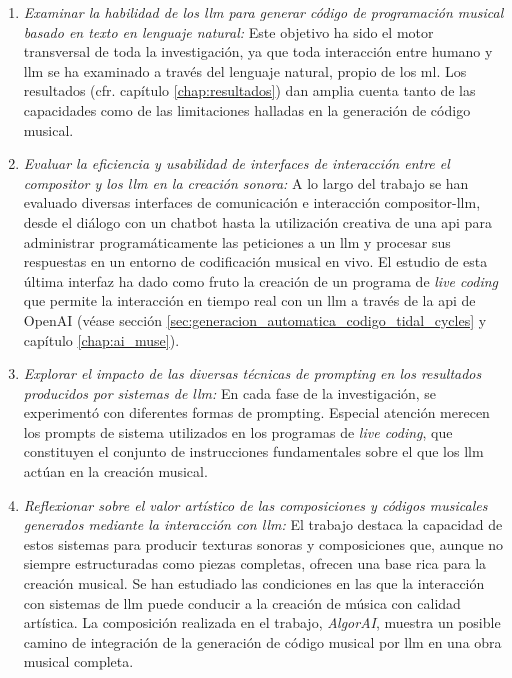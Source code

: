 \begin{enumerate}[label=\alph*)]
    \item \textit{Examinar la habilidad de los \gls{llm} para generar código de programación musical basado en texto en lenguaje natural:} Este objetivo ha sido el motor transversal de toda la investigación, ya que toda interacción entre humano y \gls{llm} se ha examinado a través del lenguaje natural, propio de los \gls{ml}. Los resultados (cfr. capítulo \ref{chap:resultados}) dan amplia cuenta tanto de las capacidades como de las limitaciones halladas en la generación de código musical.
    

    \item \textit{Evaluar la eficiencia y usabilidad de interfaces de interacción entre el compositor y los \gls{llm} en la creación sonora:} A lo largo del trabajo se han evaluado diversas interfaces de comunicación e interacción compositor-\gls{llm}, desde el diálogo con un chatbot hasta la utilización creativa de una \gls{api} para administrar programáticamente las peticiones a un \gls{llm} y procesar sus respuestas en un entorno de codificación musical en vivo. El estudio de esta última interfaz ha dado como fruto la creación de un programa de \emph{live coding} que permite la interacción en tiempo real con un \gls{llm} a través de la \gls{api} de OpenAI (véase sección \ref{sec:generacion_automatica_codigo_tidal_cycles} y capítulo \ref{chap:ai_muse}).
    

    \item \textit{Explorar el impacto de las diversas técnicas de \emph{prompting} en los resultados producidos por sistemas de \gls{llm}:} En cada fase de la investigación, se experimentó con diferentes formas de prompting. Especial atención merecen los prompts de sistema utilizados en los programas de \emph{live coding}, que constituyen el conjunto de instrucciones fundamentales sobre el que los \gls{llm} actúan en la creación musical.
    
    
    \item \textit{Reflexionar sobre el valor artístico de las composiciones y códigos musicales generados mediante la interacción con \gls{llm}:}  El trabajo destaca la capacidad de estos sistemas para producir texturas sonoras y composiciones que, aunque no siempre estructuradas como piezas completas, ofrecen una base rica para la creación musical. Se han estudiado las condiciones en las que la interacción con sistemas de \gls{llm} puede conducir a la creación de música con calidad artística. La composición realizada en el trabajo, \emph{AlgorAI}, muestra un posible camino de integración de la generación de código musical por \gls{llm} en una obra musical completa.
    

\end{enumerate}
